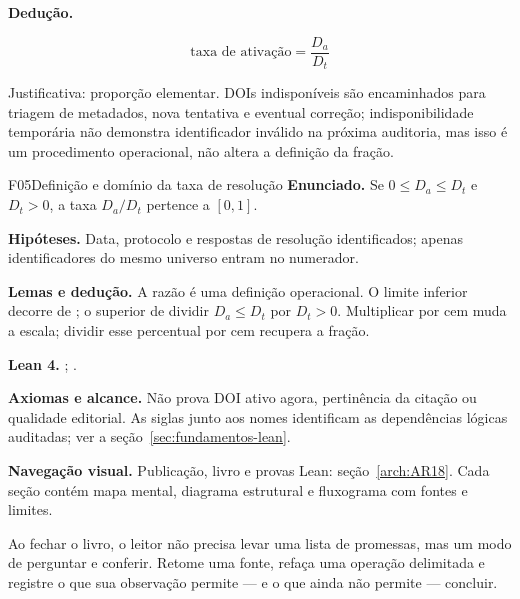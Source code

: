 \begin{metodo}
\textbf{Dedução.}

\[
\boxed{\text{taxa de ativação} = \frac{D_a}{D_t}}
\]

Justificativa: proporção elementar. DOIs indisponíveis são encaminhados para triagem de metadados, nova tentativa e eventual correção; indisponibilidade temporária não demonstra identificador inválido na próxima auditoria, mas isso é um procedimento operacional, não altera a definição da fração.
\end{metodo}
\begin{formalizacao}{F05}{Definição e domínio da taxa de resolução}
\textbf{Enunciado.} Se $0\leq D_a\leq D_t$ e $D_t>0$, a taxa $D_a/D_t$ pertence a $[0,1]$.

\textbf{Hipóteses.} Data, protocolo e respostas de resolução identificados; apenas identificadores do mesmo universo entram no numerador.

\textbf{Lemas e dedução.} A razão é uma definição operacional. O limite inferior decorre de ; o superior de dividir $D_a\leq D_t$ por $D_t>0$. Multiplicar por cem muda a escala; dividir esse percentual por cem recupera a fração.

\textbf{Lean 4.} ; .

\textbf{Axiomas e alcance.} Não prova DOI ativo agora, pertinência da citação ou qualidade editorial. As siglas junto aos nomes identificam as dependências lógicas auditadas; ver a seção~\ref{sec:fundamentos-lean}.
\end{formalizacao}




\begin{descricao}\textbf{Navegação visual.} Publicação, livro e provas Lean: seção~\ref{arch:AR18}. Cada seção contém mapa mental, diagrama estrutural e fluxograma com fontes e limites.\end{descricao}


Ao fechar o livro, o leitor não precisa levar uma lista de promessas, mas um modo de perguntar e conferir. Retome uma fonte, refaça uma operação delimitada e registre o que sua observação permite — e o que ainda não permite — concluir.
